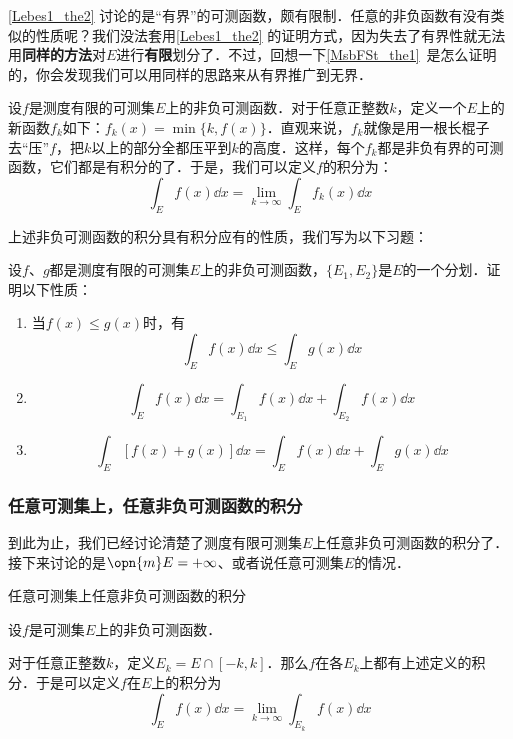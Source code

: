 \autoref{Lebes1_the2} 讨论的是“有界”的可测函数，颇有限制．任意的非负函数有没有类似的性质呢？我们没法套用\autoref{Lebes1_the2} 的证明方式，因为失去了有界性就无法用\textbf{同样的方法}对$E$进行\textbf{有限}划分了．不过，回想一下\autoref{MsbFSt_the1}~是怎么证明的，你会发现我们可以用同样的思路来从有界推广到无界．

设$f$是测度有限的可测集$E$上的非负可测函数．对于任意正整数$k$，定义一个$E$上的新函数$f_k$如下：$f_k(x)=\min \{k, f(x)\}$．直观来说，$f_k$就像是用一根长棍子去“压”$f$，把$k$以上的部分全都压平到$k$的高度．这样，每个$f_k$都是非负有界的可测函数，它们都是有积分的了．于是，我们可以定义$f$的积分为：
\begin{equation}
\int_E f(x) \dd x = \lim\limits_{k\to\infty} \int_E f_k(x) \dd x
\end{equation}

上述非负可测函数的积分具有积分应有的性质，我们写为以下习题：

\begin{exercise}{}\label{Lebes1_exe2}
设$f$、$g$都是测度有限的可测集$E$上的非负可测函数，$\{E_1, E_2\}$是$E$的一个分划．证明以下性质：
\begin{enumerate}
\item 当$f(x)\leq g(x)$时，有
\begin{equation}
\int_E f(x) \dd x\leq \int_E g(x) \dd x
\end{equation}
\item 
\begin{equation}
\int_E f(x) \dd x=\int_{E_1} f(x) \dd x+\int_{E_2} f(x) \dd x
\end{equation}
\item 
\begin{equation}
\int_E [f(x)+g(x)] \dd x = \int_E f(x) \dd x+\int_E g(x) \dd x
\end{equation}
\end{enumerate}

\end{exercise}




\subsubsection{任意可测集上，任意非负可测函数的积分}


到此为止，我们已经讨论清楚了测度有限可测集$E$上任意非负可测函数的积分了．接下来讨论的是$\opn{m}E=+\infty$、或者说任意可测集$E$的情况．

\begin{definition}{任意可测集上任意非负可测函数的积分}

设$f$是可测集$E$上的非负可测函数．

对于任意正整数$k$，定义$E_k=E\cap [-k, k]$．那么$f$在各$E_k$上都有上述定义的积分．于是可以定义$f$在$E$上的积分为
\begin{equation}
\int_E f(x) \dd x = \lim\limits_{k\to\infty}\int_{E_k} f(x) \dd x
\end{equation}

\end{definition}


